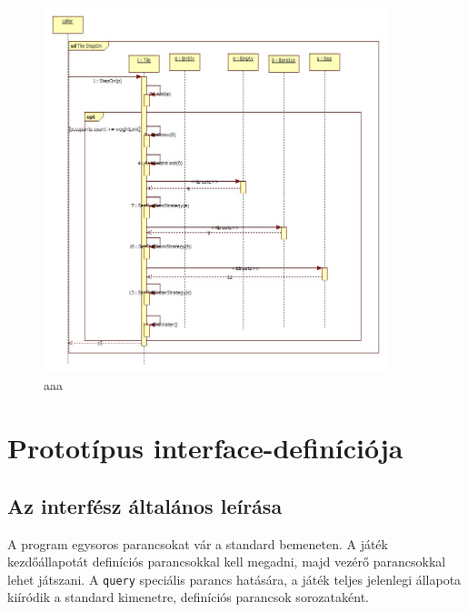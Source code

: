 \begin{figure}[H]
        \begin{center}
                \includegraphics[width=10cm]{chapters/chapter07/seqdiag/Tile_StepOn.jpg}
                \caption{aaa}
                \label{bbb}
        \end{center}
\end{figure}

\section{Prototípus interface-definíciója}

\subsection{Az interfész általános leírása}
A program egysoros parancsokat vár a standard bemeneten. A játék kezdőállapotát definíciós parancsokkal kell megadni, majd vezérő parancsokkal lehet játszani. A \texttt{query} speciális parancs hatására, a játék teljes jelenlegi állapota kiíródik a standard kimenetre, definíciós parancsok sorozataként.

